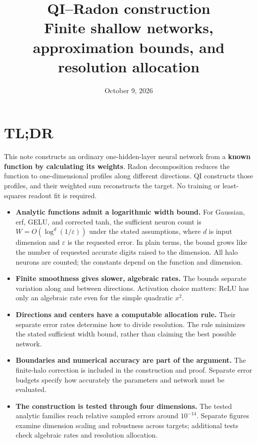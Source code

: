 \documentclass[11pt,letterpaper]{article}
\title{QI--Radon construction\\[4pt]
\large Finite shallow networks, approximation bounds, and resolution allocation}
\author{}
\date{October 9, 2026}
\newcommand{\eps}{\varepsilon}
\theoremstyle{definition}
\theoremstyle{remark}
\begin{document}
\maketitle
\vspace{-1em}
\section*{TL;DR}
This note constructs an ordinary one-hidden-layer neural network from a
\textbf{known function by calculating its weights}. Radon decomposition
reduces the function to one-dimensional profiles along different directions.
QI constructs those profiles, and their weighted sum reconstructs the target.
No training or least-squares readout fit is required.

\begin{itemize}
\item \textbf{Analytic functions admit a logarithmic width bound.}
For Gaussian, erf, GELU, and corrected tanh, the sufficient neuron count is
\(W=O(\log^d(1/\eps))\) under the stated assumptions, where \(d\) is input
dimension and \(\eps\) is the requested error. In plain terms, the bound grows
like the number of requested accurate digits raised to the dimension.
All halo neurons are counted; the constants depend on the function and dimension.

\item \textbf{Finite smoothness gives slower, algebraic rates.}
The bounds separate variation along and between directions.
Activation choice matters: ReLU has only an algebraic rate even
for the simple quadratic \(x^2\).

\item \textbf{Directions and centers have a computable allocation rule.}
Their separate error rates determine how to divide resolution. The rule
minimizes the stated sufficient width bound, rather than claiming the best
possible network.

\item \textbf{Boundaries and numerical accuracy are part of the argument.}
The finite-halo correction is included in the construction and proof.
Separate error budgets specify how accurately the parameters and network
must be evaluated.

\item \textbf{The construction is tested through four dimensions.}
The tested analytic families reach relative sampled errors around \(10^{-14}\).
Separate figures examine dimension scaling and robustness across targets;
additional tests check algebraic rates and resolution allocation.
\end{itemize}
\end{document}
